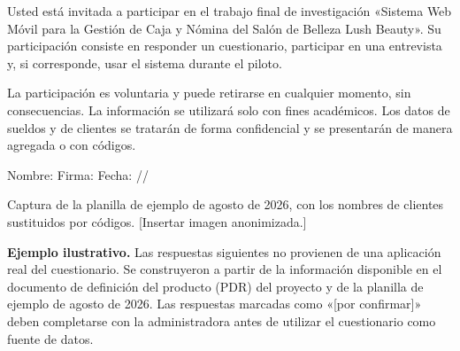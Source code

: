 



Usted está invitada a participar en el trabajo final de investigación «Sistema Web Móvil para la Gestión de Caja y Nómina del Salón de Belleza Lush Beauty». Su participación consiste en responder un cuestionario, participar en una entrevista y, si corresponde, usar el sistema durante el piloto.


La participación es voluntaria y puede retirarse en cualquier momento, sin consecuencias. La información se utilizará solo con fines académicos. Los datos de sueldos y de clientes se tratarán de forma confidencial y se presentarán de manera agregada o con códigos.


Nombre:      Firma:      Fecha: //




Captura de la planilla de ejemplo de agosto de 2026, con los nombres de clientes sustituidos por códigos. [Insertar imagen anonimizada.]




\textbf{Ejemplo ilustrativo.} Las respuestas siguientes no provienen de una aplicación real del cuestionario. Se construyeron a partir de la información disponible en el documento de definición del producto (PDR) del proyecto y de la planilla de ejemplo de agosto de 2026. Las respuestas marcadas como «[por confirmar]» deben completarse con la administradora antes de utilizar el cuestionario como fuente de datos.


